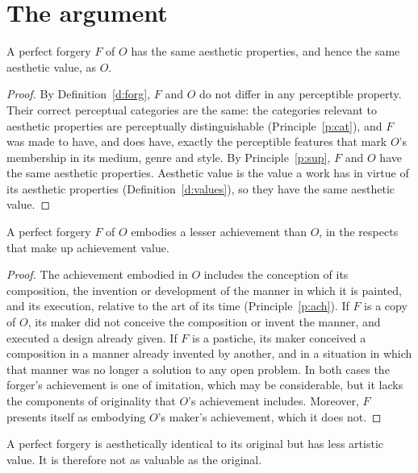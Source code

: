 \documentclass{situationist-preprint}
\begin{document}
\section{The argument}

\begin{lemma}\label{l:aesth}
A perfect forgery $F$ of $O$ has the same aesthetic properties, and hence the same aesthetic value, as $O$.
\end{lemma}

\begin{proof}
By Definition~\ref{d:forg}, $F$ and $O$ do not differ in any perceptible property. Their correct perceptual categories are the same: the categories relevant to aesthetic properties are perceptually distinguishable (Principle~\ref{p:cat}), and $F$ was made to have, and does have, exactly the perceptible features that mark $O$'s membership in its medium, genre and style. By Principle~\ref{p:sup}, $F$ and $O$ have the same aesthetic properties. Aesthetic value is the value a work has in virtue of its aesthetic properties (Definition~\ref{d:values}), so they have the same aesthetic value.
\end{proof}

\begin{lemma}\label{l:art}
A perfect forgery $F$ of $O$ embodies a lesser achievement than $O$, in the respects that make up achievement value.
\end{lemma}

\begin{proof}
The achievement embodied in $O$ includes the conception of its composition, the invention or development of the manner in which it is painted, and its execution, relative to the art of its time (Principle~\ref{p:ach}). If $F$ is a copy of $O$, its maker did not conceive the composition or invent the manner, and executed a design already given. If $F$ is a pastiche, its maker conceived a composition in a manner already invented by another, and in a situation in which that manner was no longer a solution to any open problem. In both cases the forger's achievement is one of imitation, which may be considerable, but it lacks the components of originality that $O$'s achievement includes. Moreover, $F$ presents itself as embodying $O$'s maker's achievement, which it does not.
\end{proof}

\begin{theorem}\label{t:main}
A perfect forgery is aesthetically identical to its original but has less artistic value. It is therefore not as valuable as the original.
\end{theorem}
\end{document}

